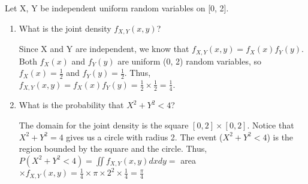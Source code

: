 \question Let X, Y be independent uniform random variables on [0, 2]. 

\begin{enumerate}[label=(\alph*)] 
\item What is the joint density $f_{X, Y}(x, y)$? 
\begin{solution}[1cm] 
Since X and Y are independent, we know that $f_{X, Y}(x, y) = f_X(x) f_Y(y)$. \\ 
Both $f_X(x)$ and $f_Y(y)$ are uniform (0, 2) random variables, so $f_X(x) = \frac{1}{2}$ and $f_Y(y) = \frac{1}{2}$. Thus, $f_{X, Y}(x, y) = f_X(x) f_Y(y) =  \frac{1}{2} \times \frac{1}{2} =  \frac{1}{4}$. 
\end{solution}

\item What is the probability that $X^2 + Y^2 < 4$? 
\begin{solution}[1cm]
The domain for the joint density is the square $[0, 2] \times [0, 2]$. Notice that $X^2 + Y^2 = 4$ gives us a circle with radius 2. The event ($X^2 + Y^2 < 4$) is the region bounded by the square and the circle. Thus, $P(X^2 + Y^2 < 4) = \iint f_{X, Y} (x, y) dx dy =$ area $\times f_{X, Y} (x, y) = \frac{1}{4} \times \pi \times 2^2 \times \frac{1}{4} = \frac{\pi}{4}$ 
\end{solution}
\end{enumerate}
